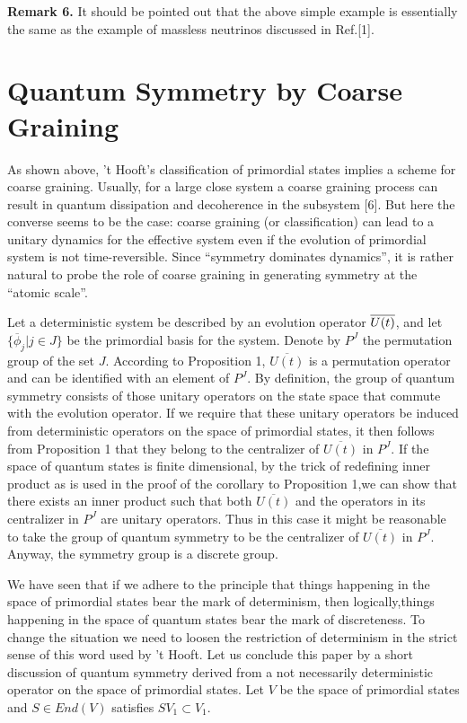 \documentclass[a4paper,12pt]{article}
\begin{document}
\textbf{Remark 6.} It should be pointed out that the above simple example is
essentially the same as the example of massless neutrinos discussed in
Ref.[1].

\section{Quantum Symmetry by Coarse Graining}

As shown above, 't Hooft's classification of primordial states implies a
scheme for coarse graining. Usually, for a large close system a coarse
graining process can result in quantum dissipation and decoherence in the
subsystem [6]. But here the converse seems to be the case: coarse graining
(or classification) can lead to a unitary dynamics for the effective system
even if the evolution of primordial system is not time-reversible. Since
``symmetry dominates dynamics'', it is rather natural to probe the role of
coarse graining in generating symmetry at the ``atomic scale''.

Let a deterministic system be described by an evolution operator $\overline{%
U(t)}$, and let $\{\overline{\phi }_j|j\in J\}$ be the primordial basis for
the system. Denote by $P^J$ the permutation group of the set $J.$ According
to Proposition 1, $\overline{U(t)}$ is a permutation operator and can be
identified with an element of $P^J.$ By definition, the group of quantum
symmetry consists of those unitary operators on the state space that commute
with the evolution operator. If we require that these unitary operators be
induced from deterministic operators on the space of primordial states, it
then follows from Proposition 1 that they belong to the centralizer of $%
\overline{U(t)}$ in $P^J.$ If the space of quantum states is finite
dimensional, by the trick of redefining inner product as is used in the
proof of the corollary to Proposition 1,we can show that there exists an
inner product such that both $\overline{U(t)}$ and the operators in its
centralizer in $P^J$ are unitary operators. Thus in this case it might be
reasonable to take the group of quantum symmetry to be the centralizer of $%
\overline{U(t)}$ in $P^J.$Anyway, the symmetry group is a discrete group.

We have seen that if we adhere to the principle that things happening in the
space of primordial states bear the mark of determinism, then
logically,things happening in the space of quantum states bear the mark of
discreteness. To change the situation we need to loosen the restriction of
determinism in the strict sense of this word used by 't Hooft. Let us
conclude this paper by a short discussion of quantum symmetry derived from a
not necessarily deterministic operator on the space of primordial states.
Let $V$ be the space of primordial states and $S\in End(V)$ satisfies $%
SV_1\subset V_1.$
\end{document}
